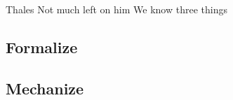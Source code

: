 \documentclass[twoside]{article}
\begin{document}
Thales
Not much left on him
We know three things

\subsection{Formalize}

\subsection{Mechanize}

 
\end{document}
